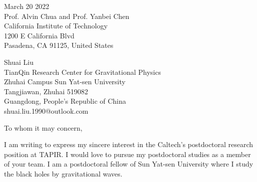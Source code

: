 \documentclass[11pt,a4paper,sans]{letter} %
\date{}
\begin{document}

\begin{letter}{March 20 2022 \\
Prof. Alvin Chua and Prof. Yanbei Chen \\
California Institute of Technology \\
1200 E California Blvd \\ 
Pasadena, CA 91125, United States}

Shuai Liu \\
TianQin Research Center for Gravitational Physics \\
Zhuhai Campus Sun Yat-sen University \\
Tangjiawan, Zhuhai 519082 \\
Guangdong, People's Republic of China \\
shuai.liu.1990@outlook.com








\opening{To whom it may concern,} 
 
I am writing to express my sincere interest in the Caltech's postdoctoral research position at TAPIR. I would love to
pursue my postdoctoral studies as a member of your team. I am a postdoctoral fellow of Sun Yat-sen University where
I study the black holes by gravitational waves.


\end{letter}
\end{document}
